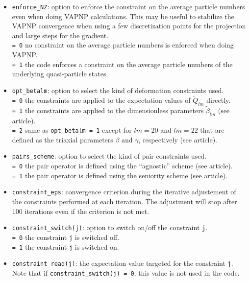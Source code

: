 \documentclass[a4paper,11pt]{article}
\newcommand{\ttt}[1]{\texttt{#1}}
\begin{document}
\begin{itemize}
\item \ttt{enforce\_NZ}: option to enforce the constraint on the average particle numbers even when doing VAPNP calculations. This may
  be useful to stabilize the VAPNP convergence when using a few discretization points for the projection and large steps for the gradient.\\[0.05cm]
  \ttt{= 0\:} no constraint on the average particle numbers is enforced when doing VAPNP. \\[0.05cm]
  \ttt{= 1\:} the code enforces a constraint on the average particle numbers of the underlying quasi-particle states.
\item \ttt{opt\_betalm}: option to select the kind of deformation constraints used. \\[0.05cm]
  \ttt{= 0\:} the constraints are applied to the expectation values of $\tilde{Q}_{lm}$ directly. \\[0.05cm]
  \ttt{= 1\:} the constraints are applied to the dimensionless parameters $\tilde{\beta}_{lm}$ (see article). \\[0.05cm]
  \ttt{= 2\:} same as \ttt{opt\_betalm = 1} except for $lm=20$ and $lm=22$ that are defined as the triaxial parameters
              $\beta$ and $\gamma$, respectively (see article).
\item \ttt{pairs\_scheme}: option to select the kind of pair constraints used. \\[0.05cm]
  \ttt{= 0\:} the pair operator is defined using the ``agnostic'' scheme (see article).  \\[0.05cm]
  \ttt{= 1\:} the pair operator is defined using the seniority scheme (see article).  %
\item \ttt{constraint\_eps}: convergence criterion during the iterative adjustement of the constraints performed at each iteration. 
  The adjustment will stop after 100 iterations even if the criterion is not met.
\item \ttt{constraint\_switch(j)}: option to switch on/off the constraint \ttt{j}. \\[0.05cm]
  \ttt{= 0\:} the constraint \ttt{j} is switched off. \\[0.05cm]
  \ttt{= 1\:} the constraint \ttt{j} is switched on. 
\item \ttt{constraint\_read(j)}: the expectation value targeted for the constraint \ttt{j}. 
      Note that if \ttt{constraint\_switch(j) = 0}, this value is not used in the code.
\end{itemize}
\end{document}
